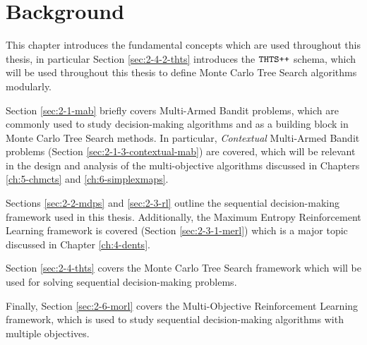 















\chapter{\label{ch:2-background}Background}

    \minitoc

    This chapter introduces the fundamental concepts which are used throughout this thesis, in particular Section \ref{sec:2-4-2-thts} introduces the ${\textnormal{\texttt{THTS++}}}$ schema, which will be used throughout this thesis to define Monte Carlo Tree Search algorithms modularly. 

    Section \ref{sec:2-1-mab} briefly covers Multi-Armed Bandit problems, which are commonly used to study decision-making algorithms and as a building block in Monte Carlo Tree Search methods. In particular, \textit{Contextual} Multi-Armed Bandit problems (Section \ref{sec:2-1-3-contextual-mab}) are covered, which will be relevant in the design and analysis of the multi-objective algorithms discussed in Chapters \ref{ch:5-chmcts} and \ref{ch:6-simplexmaps}. 
    
    Sections \ref{sec:2-2-mdps} and \ref{sec:2-3-rl} outline the sequential decision-making framework used in this thesis. Additionally, the Maximum Entropy Reinforcement Learning framework is covered (Section \ref{sec:2-3-1-merl}) which is a major topic discussed in Chapter \ref{ch:4-dents}.
    
    Section \ref{sec:2-4-thts} covers the Monte Carlo Tree Search framework which will be used for solving sequential decision-making problems. 

    Finally, Section \ref{sec:2-6-morl} covers the Multi-Objective Reinforcement Learning framework, which is used to study sequential decision-making algorithms with multiple objectives.

